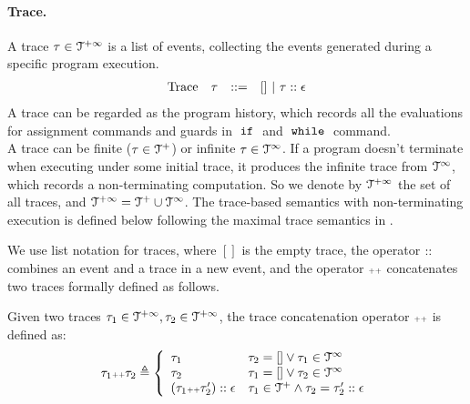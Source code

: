 \paragraph{Trace.}
%
A trace $\mathtt{\tau} \in \mathcal{T}^{+\infty}$ is a list of events, 
collecting the events generated during a specific program execution. 
\[
\begin{array}{llll}
\mbox{Trace} & \mathtt{\tau}
& ::= & [] ~|~ \mathtt{\tau} :: \mathtt{\epsilon} 
\end{array}
\]
A trace can be regarded as the program history, 
which records all the evaluations for assignment commands and guards in $\;\mathtt{if}\;$ and $\;\mathtt{while}\;$ command.
\\
{
A trace can be finite ($\mathtt{\tau} \in \mathcal{T}^{+}$) or infinite $\mathtt{\tau} \in \mathcal{T}^{\infty}$.
If a program doesn't terminate when executing under some initial trace,
it produces the infinite trace 
from $\mathcal{T}^{\infty}$, which records a non-terminating computation.
So we denote by $\mathcal{T}^{+\infty}$ the set of all traces, and $\mathcal{T}^{+\infty} = \mathcal{T}^{+} \cup \mathcal{T}^{\infty}$.
The trace-based semantics with non-terminating execution is defined below following the maximal trace semantics in \cite{Cousot19}.}

We use list notation for traces, where $[]$ is the empty trace, the operator ${\small ::}$ combines an event and a trace in a new event, 
and the operator ${\scriptscriptstyle ++}$ concatenates two traces formally defined as follows. 
\begin{defn}
  \label{def:trace_concate}
Given two traces $\mathtt{\tau}_1 \in \mathcal{T}^{+\infty}, \mathtt{\tau}_2 \in \mathcal{T}^{+\infty}$, the trace concatenation operator 
${\scriptscriptstyle ++}$ is defined as:
\[
\trace_1 \tracecat \trace_2 \triangleq
\left\{
\begin{array}{ll} 
  \trace_1 & \trace_2 = [] \lor \trace_1 \in \inftdom \\
  \trace_2 & \trace_1 = [] \lor \trace_2 \in \inftdom \\
  (\trace_1   \tracecat \trace_2'):: \event & \trace_1 \in \ftdom \land \trace_2 = \trace_2' :: \event
\end{array}
\right.
\]
\end{defn}


%
